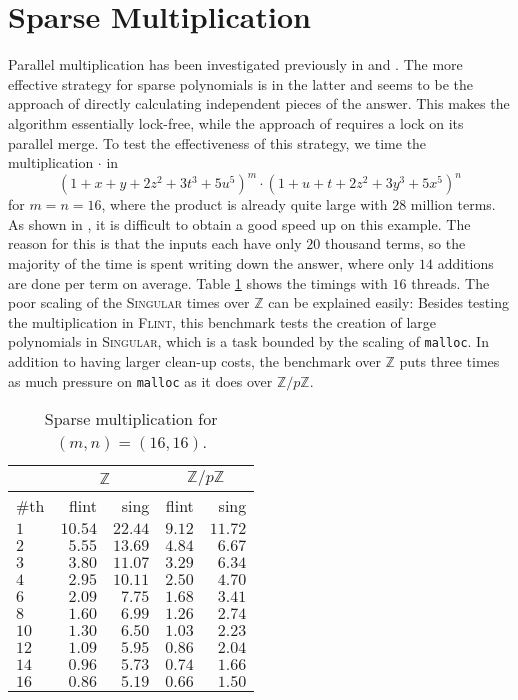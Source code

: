 \documentclass{deliverablereport}
\begin{document}
\section{Sparse Multiplication}
\label{section_sparse_mul}
Parallel multiplication has been investigated previously in \cite{Monagan:2009:PSP:1576702.1576739} and \cite{Gastineau:2013:HSM:2689622.2689630}. The more effective strategy for sparse polynomials is in the latter and seems to be the approach of directly calculating independent pieces of the answer. This makes the algorithm essentially lock-free, while the approach of \cite{Monagan:2009:PSP:1576702.1576739} requires a lock on its parallel merge. To test the effectiveness of this strategy, we time the multiplication $\cdot$ in
\begin{equation*}
(1+x+y+2z^2+3t^3+5u^5)^m \cdot (1+u+t+2z^2+3y^3+5x^5)^n
\end{equation*}
for $m=n=16$, where the product is already quite large with $28$ million terms. As shown in \cite{Monagan:2009:PSP:1576702.1576739}, it is difficult to obtain a good speed up on this example. The reason for this is that the inputs each have only $20$ thousand terms, so the majority of the time is spent writing down the answer, where only $14$ additions are done per term on average. Table \ref{table_sparse_mul1} shows the timings with $16$ threads. The poor scaling of the \textsc{Singular} times over $\mathbb{Z}$ can be explained easily: Besides testing the multiplication in \textsc{Flint}, this benchmark tests the creation of large polynomials in \textsc{Singular}, which is a task bounded by the scaling of {\tt malloc}. In addition to having larger clean-up costs, the benchmark over $\mathbb{Z}$ puts three times as much pressure on {\tt malloc} as it does over $\mathbb{Z}/p\mathbb{Z}$.
\begin{table}
\begin{tabular}{l | r | r | r | r | }
 & \multicolumn{2}{|c|}{$\mathbb{Z}$} & \multicolumn{2}{|c|}{$\mathbb{Z}/p \mathbb{Z}$} \\ \hline
\#th   & flint & sing & flint & sing\\ \hline
$1$   & $10.54$ & $22.44$ &$9.12$ & $11.72$\\ \hline
$2$   & $5.55$  & $13.69$ &$4.84$ & $6.67$\\ \hline
$3$   & $3.80$  & $11.07$ &$3.29$ & $6.34$\\ \hline
$4$   & $2.95$  & $10.11$ &$2.50$ & $4.70$\\ \hline
$6$   & $2.09$  & $7.75$ &$1.68$  & $3.41$\\ \hline
$8$   & $1.60$  & $6.99$ &$1.26$  & $2.74$\\ \hline
$10$  & $1.30$  & $6.50$ &$1.03$  & $2.23$\\ \hline
$12$  & $1.09$  & $5.95$ &$0.86$  & $2.04$\\ \hline
$14$  & $0.96$  & $5.73$ &$0.74$  & $1.66$\\ \hline
$16$  & $0.86$  & $5.19$ &$0.66$  & $1.50$\\ \hline
\end{tabular}
\caption{Sparse multiplication for $(m, n) = (16, 16)$.}
\label{table_sparse_mul1}
\end{table}
\end{document}

